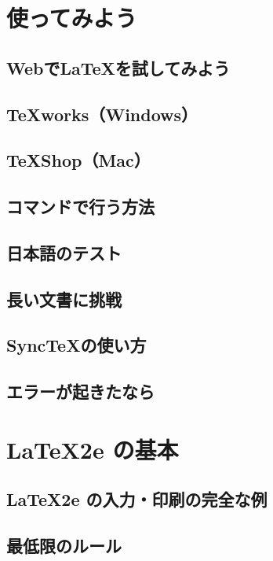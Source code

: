 \documentclass{jsbook}
\begin{document}
\chapter{使ってみよう}

\section{WebでLaTeXを試してみよう}

\section{TeXworks（Windows）}

\section{TeXShop（Mac）}

\section{コマンドで行う方法}

\section{日本語のテスト}

\section{長い文書に挑戦}

\section{SyncTeXの使い方}

\section{エラーが起きたなら}

\chapter{\LaTeX2e の基本}

\section{\LaTeX2e の入力・印刷の完全な例}

\section{最低限のルール}
\end{document}
